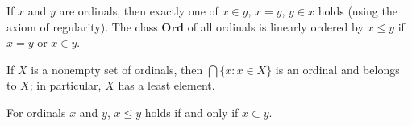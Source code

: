 If $x$ and $y$ are ordinals, then exactly one of $x \in y$, $x = y$, $y \in x$ holds (using the axiom of regularity). The class $\mathbf{Ord}$ of all ordinals is linearly ordered by $x \leqslant y$ if $x = y$ or $x \in y$.

If $X$ is a nonempty set of ordinals, then $\bigcap \{x : x \in X\}$ is an ordinal and belongs to $X$; in particular, $X$ has a least element.

For ordinals $x$ and $y$, $x \leqslant y$ holds if and only if $x \subset y$.

